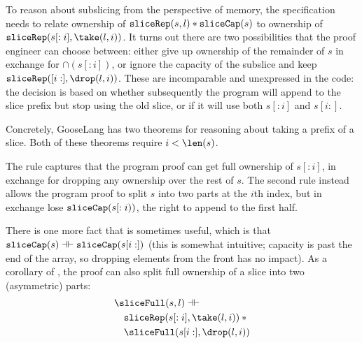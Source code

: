 To reason about subslicing from the perspective of memory, the specification
needs to relate ownership of
$\sliceRep(s, l) * \sliceCap(s)$ to ownership of
$\sliceRep(s[:i], \take(l, i))$. It turns out there are two
possibilities that the proof engineer can choose between: either give up ownership of the remainder of $s$
in exchange for $\cap(s[:i])$, or ignore the
capacity of the subslice and keep
$\sliceRep([i:], \drop(l, i))$. These are incomparable and
unexpressed in the code: the decision is based on whether subsequently the program will
append to the slice prefix but stop using the old slice, or if it will use both
$s[:i]$ and $s[i:]$.

Concretely, GooseLang has two theorems for reasoning about taking a prefix of a
slice. Both of these theorems require $i < \len(s)$.
\begin{mathpar}

\end{mathpar}

The rule  captures that the program proof can get full ownership of
$s[:i]$, in exchange for dropping any ownership over the rest of $s$.
The second rule  instead allows the program proof to split $s$ into two
parts at the $i$th index, but in exchange lose $\sliceCap(s[:i))$, the right
to append to the first half.

There is one more fact that is sometimes useful, which is that
$\sliceCap(s) \dashv\vdash \sliceCap(s[i:])$ (this is somewhat intuitive;
capacity is past the end of the array, so dropping elements from the front has
no impact). As a corollary of , the proof can also split full
ownership of a slice into two (asymmetric) parts:
\begin{align*}
  &\sliceFull(s, l) \dashv\vdash \\
  &\quad \sliceRep(s[:i], \take(l, i)) \sep {} \\
  &\quad \sliceFull(s[i:], \drop(l, i))
\end{align*}


